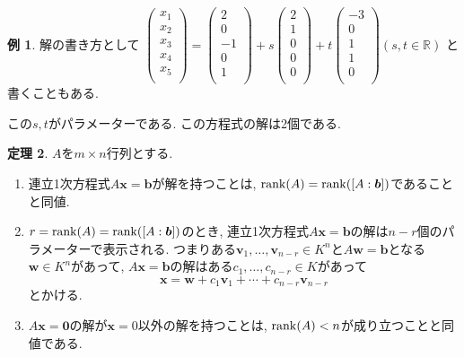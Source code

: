 \documentclass[dvipdfmx,a4paper,11pt]{article} %
\newcommand{\R}{\mathbb{R}}
\theoremstyle{definition}
\newtheorem{thm}{定理}
\newtheorem{exa}[thm]{例}
\begin{document}
\begin{exa}
解の書き方として
$
\begin{pmatrix}
x_1\\
x_2 \\
x_3 \\
x_4 \\
x_5 \\
\end{pmatrix}
=
\begin{pmatrix}
2\\
0 \\
-1 \\
0\\
1 \\
\end{pmatrix}
+ s
\begin{pmatrix}
2\\
1\\
0\\
0\\
0 \\
\end{pmatrix}
+ t
\begin{pmatrix}
-3\\
0\\
1\\
1\\
0 \\
\end{pmatrix}
(s, t \in \R)
$
と書くこともある.

この$s, t$がパラメーターである. この方程式の解は2個である. 
 \end{exa}
 
     \begin{thm}
         \label{thm-regular-1}
    $A$を$m \times n$行列とする. 
     \begin{enumerate}
    \setlength{\parskip}{0cm} 
  \setlength{\itemsep}{0cm}
 \item \cite[定理 2.4.2]{O}
 連立1次方程式$A\bm{x} =\bm{b}$が解を持つことは, ${\rm rank}(A)={\rm rank}( [A:\bm{b}])$であることと同値. 
 \item \cite[定理 2.4.6]{O}
 $r={\rm rank}(A)={\rm rank}( [A:\bm{b}])$のとき,  連立1次方程式$A\bm{x} =\bm{b}$の解は$n - r$個のパラメーターで表示される. つまりある$\bm{v}_1, \ldots, \bm{v}_{n-r} \in K^n$と$A\bm{w} =\bm{b}$となる$\bm{w} \in K^n$があって, $A\bm{x} =\bm{b}$の解はある$c_1, \ldots, c_{n-r} \in K$があって
$$
\bm{x} = \bm{w} + c_1\bm{v}_1 + \cdots + c_{n-r}\bm{v}_{n-r} 
$$
とかける. 
\item
\cite[系 2.4.8]{O} $A\bm{x} =\bm{0}$の解が$\bm{x}=0$以外の解を持つことは, ${\rm rank}(A) <n$が成り立つことと同値である. 
 \end{enumerate}
\end{thm}
\end{document}

